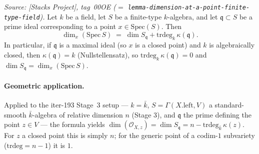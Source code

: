 \begin{lemma}
  \label{lem:smooth_algebra_krull_dim_formula}
  \textit{Source: [Stacks Project], tag~00OE (\(=\) \texttt{lemma-dimension-at-a-point-finite-type-field}).}
  Let \(k\) be a field, let \(S\) be a finite-type \(k\)-algebra, and let
  \(\mathfrak q \subset S\) be a prime ideal corresponding to a point
  \(x \in \mathrm{Spec}(S)\). Then
  \[
    \dim_x(\mathrm{Spec}\,S)
    \;=\; \dim S_{\mathfrak q} + \mathrm{trdeg}_k\,\kappa(\mathfrak q).
  \]
  In particular, if \(\mathfrak q\) is a maximal ideal (so \(x\) is a
  closed point) and \(k\) is algebraically closed, then
  \(\kappa(\mathfrak q) = k\) (Nullstellensatz), so
  \(\mathrm{trdeg}_k\,\kappa(\mathfrak q) = 0\) and
  \(\dim S_{\mathfrak q} = \dim_x(\mathrm{Spec}\,S)\).

  \paragraph{Geometric application.} Applied to the iter-193 Stage~3
  setup --- \(k = \bar k\), \(S = \Gamma(X.\mathrm{left}, V)\) a
  standard-smooth \(\bar k\)-algebra of relative dimension \(n\) (Stage
  3), and \(\mathfrak q\) the prime defining the point \(z \in V\) --- the
  formula yields \(\dim(\mathcal O_{X, z}) = \dim S_{\mathfrak q} = n -
  \mathrm{trdeg}_{\bar k}\,\kappa(z)\). For \(z\) a closed point this is
  simply \(n\); for the generic point of a codim-\(1\) subvariety
  (\(\mathrm{trdeg} = n - 1\)) it is \(1\).
\end{lemma}


